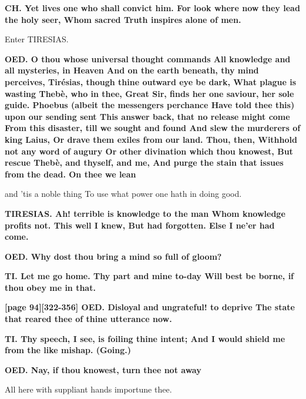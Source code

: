 \documentclass[11pt,letter]{book}
\begin{document}
\par \textbf{CH. Yet lives one who shall convict him. For look where now they lead the holy seer, Whom sacred Truth inspires alone of men.}
\par 

\par  Enter TIRESIAS.

\par \textbf{OED. O thou whose universal thought commands All knowledge and all mysteries, in Heaven And on the earth beneath, thy mind perceives, Tirésias, though thine outward eye be dark, What plague is wasting Thebè, who in thee, Great Sir, finds her one saviour, her sole guide. Phoebus (albeit the messengers perchance Have told thee this) upon our sending sent This answer back, that no release might come From this disaster, till we sought and found And slew the murderers of king Laius, Or drave them exiles from our land. Thou, then, Withhold not any word of augury Or other divination which thou knowest, But rescue Thebè, and thyself, and me, And purge the stain that issues from the dead. On thee we lean}
\par   and ’tis a noble thing To use what power one hath in doing good.

\par \textbf{TIRESIAS. Ah! terrible is knowledge to the man Whom knowledge profits not. This well I knew, But had forgotten. Else I ne’er had come.}
\par 

\par \textbf{OED. Why dost thou bring a mind so full of gloom?}
\par 

\par \textbf{TI. Let me go home. Thy part and mine to-day Will best be borne, if thou obey me in that.}
\par 

\par \textbf{[page 94][322-356] OED. Disloyal and ungrateful! to deprive The state that reared thee of thine utterance now.}
\par 

\par \textbf{TI. Thy speech, I see, is foiling thine intent; And I would shield me from the like mishap. (Going.)}
\par 

\par \textbf{OED. Nay, if thou knowest, turn thee not away}
\par   All here with suppliant hands importune thee.
\end{document}
